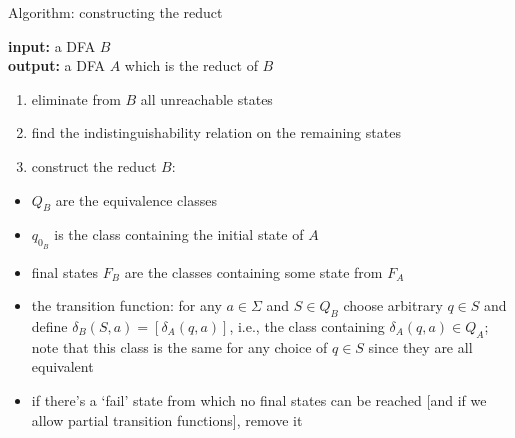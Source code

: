 \documentclass[handout]{beamer}
\begin{document}
\begin{frame}{Algorithm: constructing the reduct}
    
    \textbf{input:} a DFA $B$\\
    \textbf{output:} a DFA $A$ which is the reduct of $B$

    \begin{enumerate}
        \item eliminate from $B$ all unreachable states
        \item find the indistinguishability relation on the remaining states
        \item construct the reduct $B$:
    \end{enumerate}
    \begin{itemize}
        \item $Q_B$ are the equivalence classes
        \item $q_{0_B}$ is the class containing the initial state of $A$
        \item final states $F_B$ are the classes containing some state from $F_A$
        \item the \alert{transition function}: for any $a\in\Sigma$ and $S\in Q_B$ choose arbitrary $q\in S$ and define \alert{$\delta_B(S,a)=[\delta_A(q,a)]$}, i.e., the class containing  $\delta_A(q,a)\in Q_A$; note that this class is the same for any choice of $q\in S$ since they are all equivalent
        \item if there's a `fail' state from which no final states can be reached [and if we allow partial transition functions], remove it
    \end{itemize}

\end{frame}
\end{document}

